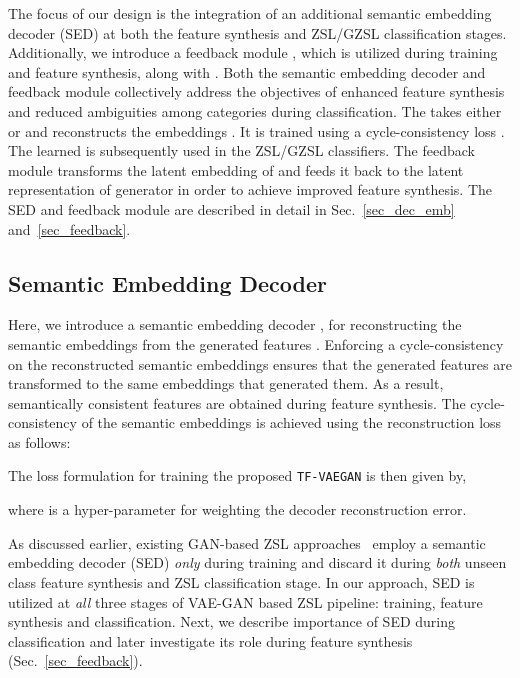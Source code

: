 \documentclass[runningheads]{llncs}
\newcommand{\proposed}{\texttt{TF-VAEGAN}}
\begin{document}
The focus of our design is the integration of an additional semantic embedding decoder (SED)  at both the feature synthesis and ZSL/GZSL classification stages. Additionally, we introduce a feedback module , which is utilized during training and feature synthesis, along with . Both the semantic embedding decoder  and feedback module  collectively address the objectives of enhanced feature synthesis and reduced ambiguities among categories during classification. The  takes either  or  and reconstructs the embeddings . It is trained using a cycle-consistency loss . The learned  is subsequently used in the ZSL/GZSL classifiers. The feedback module  transforms the latent embedding of  and feeds it back to the latent representation of generator  in order to achieve improved feature synthesis. The SED  and feedback module  are described in detail in Sec.~\ref{sec_dec_emb} and~\ref{sec_feedback}. 


\subsection{Semantic Embedding Decoder\label{sec_dec_emb}}
Here, we introduce a semantic embedding decoder , for reconstructing the semantic embeddings  from the generated features . Enforcing a cycle-consistency on the reconstructed semantic embeddings ensures that the generated features are transformed to the same embeddings that generated them. As a result, semantically consistent features are obtained during feature synthesis. The cycle-consistency of the semantic embeddings is achieved using the  reconstruction loss as follows:

The loss formulation for training the proposed \proposed{} is then given by,

\noindent where  is a hyper-parameter for weighting the decoder reconstruction error. 

As discussed earlier, existing GAN-based ZSL approaches~\cite{Rafael18eccv,Zhang18ijcai} employ a semantic embedding decoder (SED) \textit{only} during training and discard it during \textit{both} unseen class feature synthesis and ZSL classification stage. In our approach, SED is utilized at \textit{all} three stages of VAE-GAN based ZSL pipeline: training, feature synthesis and classification. Next, we describe importance of SED during classification and later investigate its role during feature synthesis  (Sec.~\ref{sec_feedback}).
\end{document}

